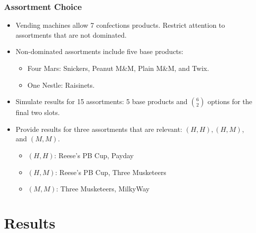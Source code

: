 \documentclass[aspectratio=169,11pt]{beamer}
\begin{document}
\begin{frame}[label=main]
\frametitle{Assortment Choice}
\begin{itemize}
\item Vending machines allow 7 confections products. Restrict attention to assortments that are not dominated.
\item Non-dominated assortments include five base products:
\begin{itemize}
\item Four Mars: Snickers, Peanut M\&M, Plain M\&M, and Twix. 
\item One Nestle: Raisinets.
\end{itemize}
\item Simulate results for 15 assortments: 5 base products and $6 \choose 2$ options for the final two slots.
\item Provide results for three assortments that are relevant: $(H,H), (H,M)$, and $(M,M)$.
\begin{itemize}
\item $(H,H)$: Reese's PB Cup, Payday
\item $(H,M)$: Reese's PB Cup, Three Musketeers
\item $(M,M)$: Three Musketeers, MilkyWay
\end{itemize}
\end{itemize}
\hyperlink{supplemental1}{}
\hyperlink{supplemental2}{}
\end{frame}


\section{Results}
\end{document}
